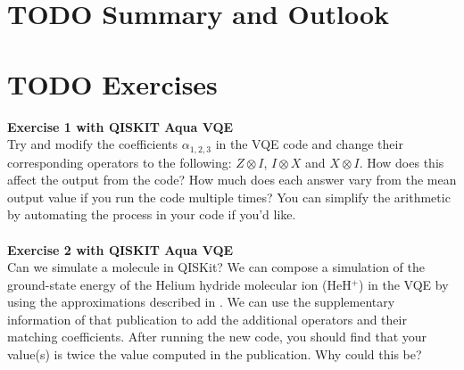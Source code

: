 




\section{TODO Summary and Outlook}


\section{TODO Exercises}

\textbf{Exercise 1 with QISKIT Aqua VQE}
\\
Try and modify the coefficients $\alpha_{1,2,3}$ in the VQE code and change their corresponding operators to the following: $Z\otimes I$, $I \otimes X$ and $X \otimes I$. How does this affect the output from the code? How much does each answer vary from the mean output value if you run the code multiple times? You can simplify the arithmetic by automating the process in your code if you'd like.
\\
\\
\textbf{Exercise 2 with QISKIT Aqua VQE}
\\
Can we simulate a molecule in QISKit? We can compose a simulation of the ground-state energy of the Helium hydride molecular ion (HeH$^{+}$) in the VQE by using the approximations described in . We can use the supplementary information of that publication to add the additional operators and their matching coefficients. After running the new code, you should find that your value(s) is twice the value computed in the publication. Why could this be?  


